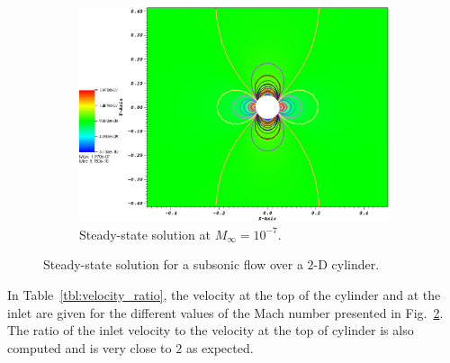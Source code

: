 \documentclass[preprint,10pt]{elsarticle}
\newcommand{\fig}[1]{Fig.~\ref{#1}}                      %
\newcommand{\tbl}[1]{Table~\ref{#1}}                     %
\begin{document}
\begin{figure}[H]
\begin{subfigure}[b]{0.495\textwidth}
        \end{subfigure}
        \begin{subfigure}[b]{0.495\textwidth}
                \centering
                \includegraphics[width=\textwidth]{CylinderMach1em7ZoomIn.png}
                \caption{Steady-state solution at $M_\infty=10^{-7}$.}
                \label{fig:cyl_1em7}
        \end{subfigure}
        \caption{Steady-state solution for a subsonic flow over a $2$-D cylinder.}\label{fig:cylinder}
\end{figure}
In \tbl{tbl:velocity_ratio}, the velocity at the top of the cylinder and at the inlet are given for the different values of the Mach number presented in \fig{fig:cylinder}. The ratio of the inlet velocity to the velocity at the top of cylinder is also computed and is very close to $2$ as expected.
\end{document}
